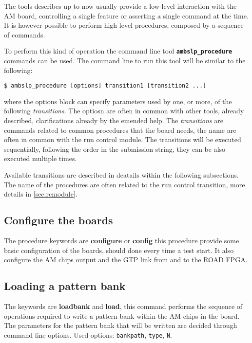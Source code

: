 The tools describes up to now usually provide a low-level
interaction with the AM board, controlling a single feature
or asserting a single command at the time. It is however 
possible to perform high level procedures, composed by a sequence
of commands.

To perform this kind of operation the command line tool
\textbf{\texttt{ambslp\_procedure}} commands can be used. The
command line to run this tool will be similar to the
following:
\begin{verbatim}
$ ambslp_procedure [options] transition1 [transition2 ...]
\end{verbatim}
where the options block can specify parameters used by one, or more,
of the following \emph{transitions}. The optiosn are often in common
with other tools, already described, clarifications already by the emended help.
The \emph{transitions} are commands related to common procedures
that the board needs, the name are often in common with the
run control module. The transitions will be executed
sequentially, following the order in the submission string, they can 
be also executed multiple times.

Available transitions are described in deatails within the following 
subsections. The name of the procedures are often related to the run
control transition, more details in \ref{sec:rcmodule}.

\subsection{Configure the boards}
\label{sec:procconfigure}

The procedure keywords are \textbf{configure} or \textbf{config}  this procedure provide some basic configuration of the boards, should done every time a test start. It
    also configure the AM chips output and the GTP link from and to the
    ROAD FPGA.

\subsection{Loading a pattern bank}
\label{sec:procloadbank}
The keywords are \textbf{loadbank} 
and \textbf{load}, 
this command performs the
	sequence of operations required to write a pattern bank within
	the AM chips in the board. The parameters for the pattern bank 
	that will be written are decided through command line options.
	Used options: \texttt{bankpath}, \texttt{type}, \texttt{N}.
    
